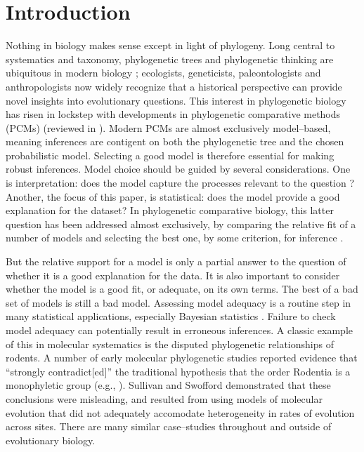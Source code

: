 \documentclass[a4paper,12pt]{article}
\begin{document}
\section{Introduction}
Nothing in biology makes sense except in light of phylogeny. Long central to systematics and taxonomy, phylogenetic trees and phylogenetic thinking are ubiquitous in modern biology \citep{PennellHarmon}; ecologists, geneticists, paleontologists and anthropologists now widely recognize that a historical perspective can provide novel insights into evolutionary questions. This interest in phylogenetic biology has risen in lockstep with developments in phylogenetic comparative methods (PCMs) (reviewed in \citep{PennellHarmon}). Modern PCMs are almost exclusively model--based, meaning inferences are contigent on both the phylogenetic tree and the chosen probabilistic model. Selecting a good model is therefore essential for making robust inferences. Model choice should be guided by several considerations. One is interpretation: does the model capture the processes relevant to the question \citep{HansenOrzack2005, Hansen2012, PennellPE}? Another, the focus of this paper, is statistical: does the model provide a good explanation for the dataset? In phylogenetic comparative biology, this latter question has been addressed almost exclusively, by comparing the relative fit of a number of models and selecting the best one, by some criterion, for inference \citep{Mooers1999, Harmon2010, Hunt2012}. 

But the relative support for a model is only a partial answer to the question of whether it is a good explanation for the data. It is also important to consider whether the model is a good fit, or adequate, on its own terms. The best of a bad set of models is still a bad model. Assessing model adequacy is a routine step in many statistical applications, especially Bayesian statistics \citep{Gelmanbook}. Failure to check model adequacy can potentially result in erroneous inferences. A classic example of this in molecular systematics is the disputed phylogenetic relationships of rodents. A number of early molecular phylogenetic studies reported evidence that ``strongly contradict[ed]'' the traditional hypothesis that the order Rodentia is a monophyletic group (e.g., \citep{Graur1991, DErchia1996}). Sullivan and Swofford \citep{Sullivan1997} demonstrated that these conclusions were misleading, and resulted from using models of molecular evolution that did not adequately accomodate  heterogeneity in rates of evolution across sites. There are many similar case--studies throughout and outside of evolutionary biology.
\end{document}
